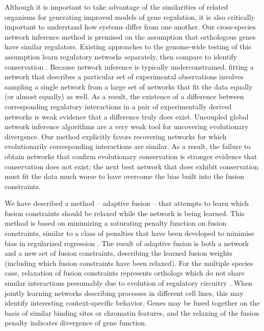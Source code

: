 \documentclass[11pt]{article}
\begin{document}
Although it is important to take advantage of the similarities of related organisms for generating improved models of gene regulation, it is also critically important to understand how systems differ from one another. 
Our cross-species network inference method is premised on the assumption that orthologous genes have similar regulators. 
Existing approaches to the genome-wide testing of this assumption learn regulatory networks separately, then compare to identify conservation \cite{aytes_cross-species_2014}. 
Because network inference is typically underconstrained, fitting a network that describes a particular set of experimental observations involves sampling a single network from a large set of networks that fit the data equally (or almost equally) as well. As a result, the existence of a difference between corresponding regulatory interactions in a pair of experimentally derived networks is weak evidence that a difference truly does exist. 
Uncoupled global network inference algorithms are a very weak tool for uncovering evolutionary divergence. 
Our method explicitly favors recovering networks for which evolutionarily corresponding interactions are similar. 
As a result, the failure to obtain networks that confirm evolutionary conservation is stronger evidence that conservation does not exist; the next best network that does exhibit conservation must fit the data much worse to have overcome the bias built into the fusion constraints. 

We have described a method -- adaptive fusion -- that attempts to learn which fusion constraints should be relaxed while the network is being learned. 
This method is based on minimizing a saturating penalty function on fusion constraints, similar to a class of penalties that have been developed to minimise bias in regularized regression \cite{fan2001variable,zhang2010nearly}. 
The result of adaptive fusion is both a network and a new set of fusion constraints, describing the learned fusion weights (including which fusion constraints have been relaxed). 
For the multiple species case, relaxation of fusion constraints represents orthologs which do not share similar interactions presumably due to evolution of regulatory circuitry \cite{kellis_proof_2004}. %
When jointly learning networks describing processes in different cell lines, this may identify interesting context-specific behavior. 
Genes may be fused together on the basis of similar binding sites or chromatin features, and the relaxing of the fusion penalty indicates divergence of gene function. 
\end{document}
